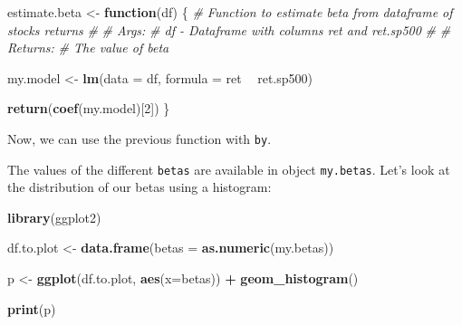 \documentclass[11pt,]{book}
\newenvironment{Shaded}{\begin{snugshade}}{\end{snugshade}}
\newcommand{\KeywordTok}[1]{\textcolor[rgb]{0.27,0.27,0.27}{\textbf{#1}}}
\newcommand{\DataTypeTok}[1]{\textcolor[rgb]{0.27,0.27,0.27}{#1}}
\newcommand{\DecValTok}[1]{\textcolor[rgb]{0.06,0.06,0.06}{#1}}
\newcommand{\StringTok}[1]{\textcolor[rgb]{0.5,0.5,0.5}{#1}}
\newcommand{\CommentTok}[1]{\textcolor[rgb]{0.56,0.35,0.01}{\textit{#1}}}
\newcommand{\ControlFlowTok}[1]{\textcolor[rgb]{0.13,0.29,0.53}{\textbf{#1}}}
\newcommand{\OperatorTok}[1]{\textcolor[rgb]{0.81,0.36,0.00}{\textbf{#1}}}
\newcommand{\NormalTok}[1]{#1}
\begin{document}
\begin{Shaded}
\begin{Highlighting}[]
\NormalTok{estimate.beta <-}\StringTok{ }\ControlFlowTok{function}\NormalTok{(df) \{}
  \CommentTok{# Function to estimate beta from dataframe of stocks returns}
  \CommentTok{#}
  \CommentTok{# Args:}
  \CommentTok{#   df - Dataframe with columns ret and ret.sp500}
  \CommentTok{#}
  \CommentTok{# Returns:}
  \CommentTok{#   The value of beta}
  
\NormalTok{  my.model <-}\StringTok{ }\KeywordTok{lm}\NormalTok{(}\DataTypeTok{data =}\NormalTok{ df, }\DataTypeTok{formula =}\NormalTok{ ret }\OperatorTok{~}\StringTok{ }\NormalTok{ret.sp500)}
  
  \KeywordTok{return}\NormalTok{(}\KeywordTok{coef}\NormalTok{(my.model)[}\DecValTok{2}\NormalTok{])}
\NormalTok{\}}
\end{Highlighting}
\end{Shaded}

Now, we can use the previous function with \texttt{by}.

\begin{Shaded}
\end{Shaded}

The values of the different \texttt{betas} are available in object
\texttt{my.betas}. Let's look at the distribution of our betas using a
histogram:

\begin{Shaded}
\begin{Highlighting}[]
\KeywordTok{library}\NormalTok{(ggplot2)}

\NormalTok{df.to.plot <-}\StringTok{ }\KeywordTok{data.frame}\NormalTok{(}\DataTypeTok{betas =} \KeywordTok{as.numeric}\NormalTok{(my.betas)) }

\NormalTok{p <-}\StringTok{ }\KeywordTok{ggplot}\NormalTok{(df.to.plot, }\KeywordTok{aes}\NormalTok{(}\DataTypeTok{x=}\NormalTok{betas)) }\OperatorTok{+}
\StringTok{  }\KeywordTok{geom_histogram}\NormalTok{()}

\KeywordTok{print}\NormalTok{(p)}
\end{Highlighting}
\end{Shaded}
\end{document}
